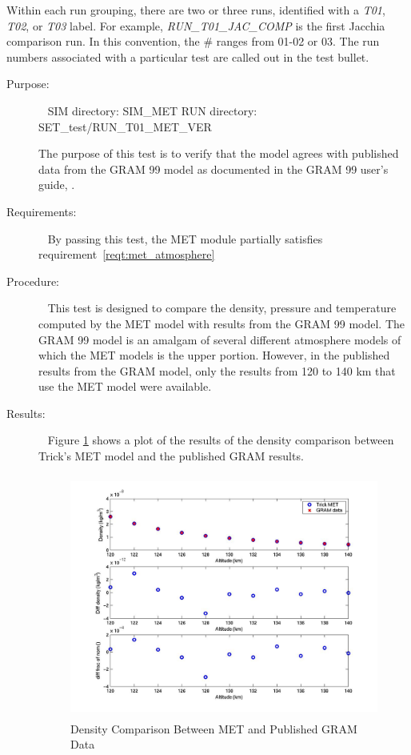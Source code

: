 Within each run grouping, there are two or three runs, identified with a
\textit{T01}, \textit{T02}, or \textit{T03} label.
For example, \textit{RUN\_T01\_JAC\_COMP} is the first Jacchia comparison run.
In this convention, the \# ranges from 01-02 or 03.
The run numbers associated with a particular test are called out
in the test bullet.

\label{test:met_GRAM_99}
\begin{description}
\item[Purpose:] \ \newline
SIM directory: SIM\_MET \newline
RUN directory: SET\_test/RUN\_T01\_MET\_VER

The purpose of this test is to verify that the model agrees with published
data from the GRAM 99 model as documented in the GRAM 99 user's guide,
\cite{GRAM_use}.
\item[Requirements:] \ \newline
By passing this test, the MET module partially satisfies
requirement~\ref{reqt:met_atmosphere}
\item[Procedure:]\ \newline
This test is designed to compare the density, pressure and temperature computed
by the MET model with results from the GRAM 99 model.  The GRAM 99 model is an
amalgam of several different atmosphere models of which the MET models is the
upper portion.  However, in the published results from the GRAM model, only the
results from 120 to 140 km that use the MET model were available.

\item[Results:]\ \newline
Figure \ref{MET_dens_pub_comp} shows a plot of the results of the density
comparison between Trick's MET model and the published GRAM results.

\begin{figure}[H]
\begin{center}
\includegraphics[height=80mm]{pics/MET_T01_density.jpg}
\caption{Density Comparison Between MET and Published GRAM Data}
\label{MET_dens_pub_comp}
\end{center}
\end{figure}


\end{description}
